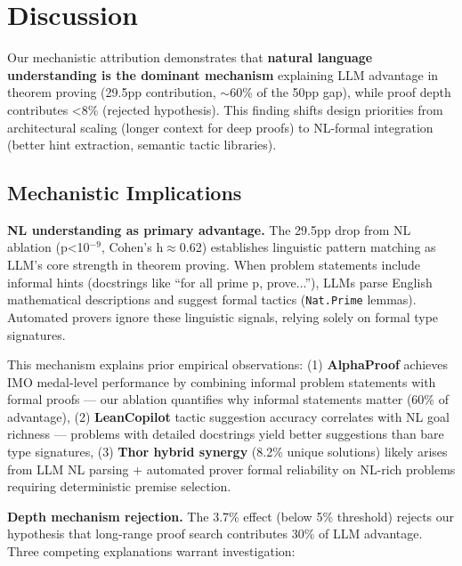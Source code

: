 \section{Discussion}

Our mechanistic attribution demonstrates that \textbf{natural language understanding is the dominant mechanism} explaining LLM advantage in theorem proving (29.5pp contribution, $\sim$60\% of the 50pp gap), while proof depth contributes <8\% (rejected hypothesis). This finding shifts design priorities from architectural scaling (longer context for deep proofs) to NL-formal integration (better hint extraction, semantic tactic libraries).

\subsection{Mechanistic Implications}

\textbf{NL understanding as primary advantage.} The 29.5pp drop from NL ablation (p<10$^{-9}$, Cohen's h$\approx$0.62) establishes linguistic pattern matching as LLM's core strength in theorem proving. When problem statements include informal hints (docstrings like ``for all prime p, prove...''), LLMs parse English mathematical descriptions and suggest formal tactics (\texttt{Nat.Prime} lemmas). Automated provers ignore these linguistic signals, relying solely on formal type signatures.

This mechanism explains prior empirical observations: (1) \textbf{AlphaProof} \cite{AlphaProof_2024} achieves IMO medal-level performance by combining informal problem statements with formal proofs --- our ablation quantifies why informal statements matter (60\% of advantage), (2) \textbf{LeanCopilot} \cite{LeanCopilot} tactic suggestion accuracy correlates with NL goal richness --- problems with detailed docstrings yield better suggestions than bare type signatures, (3) \textbf{Thor hybrid synergy} \cite{Thor_2022} (8.2\% unique solutions) likely arises from LLM NL parsing + automated prover formal reliability on NL-rich problems requiring deterministic premise selection.

\textbf{Depth mechanism rejection.} The 3.7\% effect (below 5\% threshold) rejects our hypothesis that long-range proof search contributes 30\% of LLM advantage. Three competing explanations warrant investigation:

